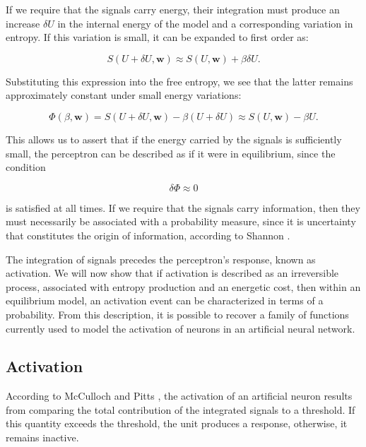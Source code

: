 \documentclass[12pt]{article}
\begin{document}
If we require that the signals carry energy, their integration must produce an increase $\delta U$ in the internal energy of the model and a corresponding variation in entropy. If this variation is small, it can be expanded to first order as:

\begin{equation}
S(U+\delta U, \mathbf{w}) \approx S(U, \mathbf{w}) + \beta \delta U.
\end{equation}

Substituting this expression into the free entropy, we see that the latter remains approximately constant under small energy variations:

\begin{equation}
\Phi(\beta, \mathbf{w}) = S(U + \delta U,\mathbf{w}) - \beta (U + \delta U) \approx S(U, \mathbf{w}) - \beta U.
\end{equation}

This allows us to assert that if the energy carried by the signals is sufficiently small, the perceptron can be described as if it were in equilibrium, since the condition

\begin{equation}
\delta \Phi \approx 0
\end{equation}

is satisfied at all times. If we require that the signals carry information, then they must necessarily be associated with a probability measure, since it is uncertainty that constitutes the origin of information, according to Shannon \cite{shannon1948mathematical}.

The integration of signals precedes the perceptron’s response, known as activation. We will now show that if activation is described as an irreversible process, associated with entropy production and an energetic cost, then within an equilibrium model, an activation event can be characterized in terms of a probability. From this description, it is possible to recover a family of functions currently used to model the activation of neurons in an artificial neural network.
\subsection*{Activation}

According to McCulloch and Pitts \cite{mcculloch1943logical}, the activation of an artificial neuron results from comparing the total contribution of the integrated signals to a threshold. If this quantity exceeds the threshold, the unit produces a response, otherwise, it remains inactive.
\end{document}
